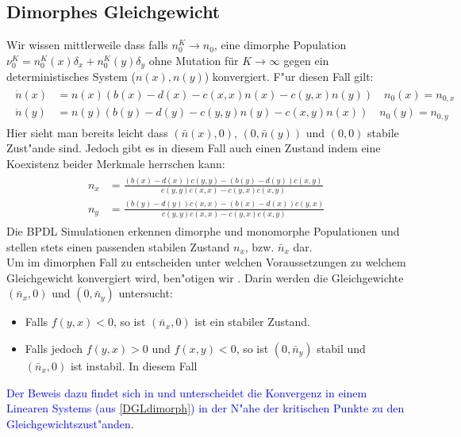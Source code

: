 \documentclass[11pt, a4paper, german]{article}
\theoremstyle{plain}
\begin{document}
	\subsection{Dimorphes Gleichgewicht}
		Wir wissen mittlerweile dass falls $ n_0^K \to n_0 $, eine dimorphe Population $ \nu_0^K = n_0^K(x) \delta_x + n_0^K(y) \delta_y $ ohne Mutation für $ K \to \infty $ gegen ein deterministisches System ($ n(x), n(y) $) konvergiert. F"ur diesen Fall gilt:
		\begin{align}
		\begin{split}
			\dot{n}(x) & = n(x) (b(x) - d(x) - c(x,x)n(x) - c(y,x) n(y)) \quad n_0(x) = n_{0,x} \\
			\dot{n}(y) & = n(y) (b(y) - d(y) - c(y,y)n(y) - c(x,y) n(x)) \quad n_0(y) = n_{0,y} \label{DGLdimorph}
		\end{split}
		\end{align}
		Hier sieht man bereits leicht dass $ (\bar{n}(x), 0) $, $ (0, \bar{n}(y)) $ und $ (0,0) $ stabile Zust"ande sind. Jedoch gibt es in diesem Fall auch einen Zustand indem eine Koexistenz beider Merkmale herrschen kann:
		\begin{align}
		\begin{split}
			n_x &= \frac{(b(x) - d(x))c(y,y)-(b(y)-d(y))c(x,y)}{c(y,y)c(x,x) - c(y,x)c(x,y)}\\
			n_y &= \frac{(b(y) - d(y))c(x,x)-(b(x)-d(x))c(y,x)}{c(y,y)c(x,x) - c(y,x)c(x,y)} \label{GleichgewichtDimorph}
		\end{split}
		\end{align}
		Die BPDL Simulationen erkennen dimorphe und monomorphe Populationen und stellen stets einen passenden stabilen Zustand $ n_x $, bzw. $ \bar{n}_x $ dar. \\
		Um im dimorphen Fall zu entscheiden unter welchen Voraussetzungen zu welchem Gleichgewicht konvergiert wird, ben"otigen wir \cite[Proposition 3]{Champagnat20061127}. Darin werden die Gleichgewichte $ (\bar{n}_x, 0) $ und $ (0, \bar{n}_y) $ untersucht:
		\begin{itemize}
			\item[] Falls $ f(y,x) < 0 $, so ist $ (\bar{n}_x, 0) $ ist ein stabiler Zustand.
			\item[] Falls jedoch $ f(y,x) > 0 $ und $ f(x,y) < 0 $, so ist $ (0, \bar{n}_y) $ stabil und $ (\bar{n}_x, 0) $ ist instabil. In diesem Fall
		\end{itemize}
		\textcolor{blue}{Der Beweis dazu findet sich in \cite{Silke} und unterscheidet die Konvergenz in einem Linearen Systems (aus \ref{DGLdimorph}) in der N"ahe der kritischen Punkte zu den Gleichgewichtszust"anden}.\\
\end{document}
